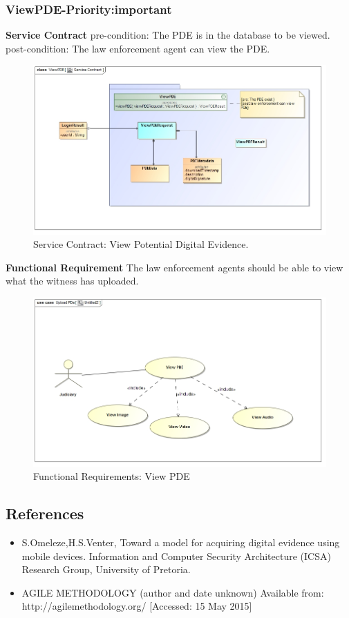\documentclass[a4paper,12pt]{article}
\begin{document}
\subsubsection{ViewPDE-Priority:important}
\textbf{Service Contract}\newline
pre-condition: The PDE is in the database to be viewed.\newline
post-condition: The law enforcement agent can view the PDE.\newline
\begin{figure}[H]
\includegraphics[width=\textwidth]{images/viewServiceContract.jpg}
\caption{Service Contract: View Potential Digital Evidence.\label{overflow}}
\end{figure}\newpage
\textbf{Functional Requirement}\newline
The law enforcement agents should be able to view what the witness has uploaded.\newline
\begin{figure}[H]
\includegraphics[width=\textwidth]{images/view.jpg}
\caption{Functional Requirements: View PDE\label{overflow}}
\end{figure}
\newpage
		
\subsection{References}
\begin{itemize}
\item S.Omeleze,H.S.Venter, Toward a model for acquiring digital evidence using mobile devices. Information and Computer Security Architecture (ICSA) Research Group, University of Pretoria.
\item AGILE METHODOLOGY (author and date unknown)
	Available from: http://agilemethodology.org/ [Accessed: 15 May 2015]
\end{itemize}
\end{document}
